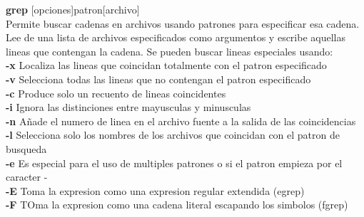 \documentclass[11pt]{article}
\begin{document}
 \textbf{grep} [opciones]patron[archivo]\\

Permite buscar cadenas en archivos usando patrones para especificar esa cadena. Lee de una lista de archivos especificados como argumentos y escribe aquellas lineas que contengan la cadena. Se pueden buscar lineas especiales usando:\\

\hspace{2cm} \textbf{-x}\hspace{2cm} Localiza las lineas que coincidan totalmente con el patron especificado \\

\hspace{2cm} \textbf{-v}\hspace{2cm} Selecciona todas las lineas que no contengan el patron especificado \\

\hspace{2cm} \textbf{-c}\hspace{2cm} Produce solo un recuento de lineas coincidentes \\

\hspace{2cm} \textbf{-i}\hspace{2cm} Ignora las distinciones entre mayusculas y minusculas\\

\hspace{2cm} \textbf{-n}\hspace{2cm} Añade el numero de linea en el archivo fuente a la salida de las coincidencias \\

\hspace{2cm} \textbf{-l}\hspace{2cm} Selecciona solo los nombres de los archivos que coincidan con el patron de busqueda\\

\hspace{2cm} \textbf{-e}\hspace{2cm} Es especial para el uso de multiples patrones o si el patron empieza por el caracter -\\

\hspace{2cm} \textbf{-E}\hspace{2cm} Toma la expresion como una expresion regular extendida (egrep)\\

\hspace{2cm} \textbf{-F}\hspace{2cm} TOma la expresion como una cadena literal escapando los simbolos (fgrep)\\
\end{document}
